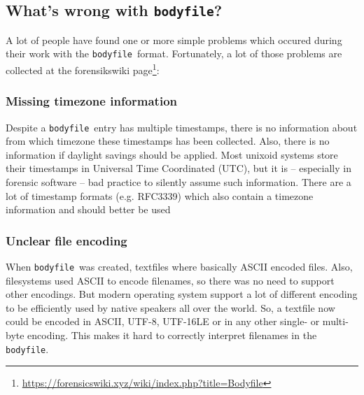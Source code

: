 \documentclass[twocolumn]{article}
\newcommand{\bodyfile}{\texttt{bodyfile}}
\begin{document}
\subsection{What's wrong with \bodyfile?}

A lot of people have found one or more simple problems which occured during their work with the \bodyfile\ format. Fortunately, a lot of those problems are collected at the forensikswiki page\footnote{\url{https://forensicswiki.xyz/wiki/index.php?title=Bodyfile}}:

\subsubsection{Missing timezone information}

Despite a \bodyfile\ entry has multiple timestamps, there is no information about from which timezone these timestamps has been collected. Also, there is no information if daylight savings should be applied. Most unixoid systems store their timestamps in Universal Time Coordinated (UTC), but it is -- especially in forensic software -- bad practice to silently assume such information. There are a lot of timestamp formats (e.g. RFC3339) which also contain a timezone information and should better be used

\subsubsection{Unclear file encoding}

When \bodyfile\ was created, textfiles where basically ASCII encoded files. Also, filesystems used ASCII to encode filenames, so there was no need to support other encodings. But modern operating system support a lot of different encoding to be efficiently used by native speakers all over the world. So, a textfile now could be encoded in ASCII, UTF-8, UTF-16LE or in any other single- or multi-byte encoding. This makes it hard to correctly interpret filenames in the \bodyfile.
\end{document}
